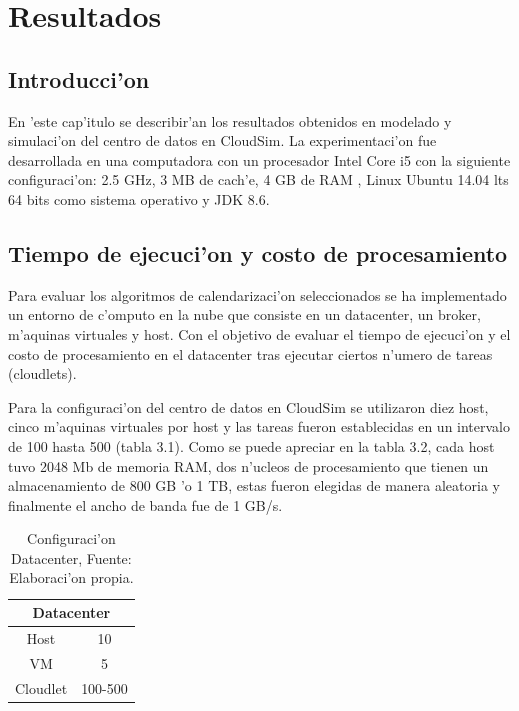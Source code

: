 \chapter{Resultados}
\section*{Introducci'on}

En 'este cap'itulo se describir'an los resultados obtenidos en modelado y simulaci'on del centro de datos en CloudSim. La experimentaci'on fue desarrollada en una computadora con  un procesador Intel Core i5  con la siguiente configuraci'on: 2.5 GHz, 3 MB de cach'e, 4 GB de RAM , Linux Ubuntu 14.04 lts 64 bits como sistema operativo y JDK 8.6.






\vspace{20em} 

\section{Tiempo de ejecuci'on y costo de procesamiento}


Para evaluar los algoritmos de calendarizaci'on seleccionados se ha implementado un entorno de c'omputo en la nube que consiste en un datacenter, un broker, m'aquinas virtuales y host.  Con el objetivo de evaluar el tiempo de ejecuci'on y el costo de procesamiento en el datacenter tras ejecutar ciertos n'umero de tareas (cloudlets).




Para la configuraci'on del centro de datos en CloudSim se utilizaron diez host, cinco m'aquinas virtuales por host y las tareas fueron establecidas en un intervalo de 100 hasta 500 (tabla 3.1).
Como se puede apreciar en la tabla 3.2, cada host tuvo 2048 Mb de memoria RAM, dos n'ucleos de procesamiento que tienen un almacenamiento de 800 GB 'o 1 TB, estas fueron elegidas de manera aleatoria y finalmente el ancho de banda fue de 1 GB/s.


\begin{table}[!hbt]
 
	\centering
	\caption{Configuraci'on Datacenter, Fuente: Elaboraci'on propia.}
	\begin{tabular}{@{}cc@{}}
		\toprule
		\multicolumn{2}{c}{{\bf Datacenter}} \\ \midrule
		Host              & 10               \\
		VM                & 5                \\
		Cloudlet          & 100-500          \\ \bottomrule
	\end{tabular}
\end{table}
 
